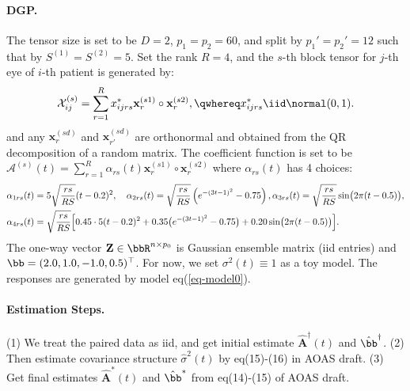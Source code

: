 \documentclass[10pt]{notes}
\begin{document}
\paragraph*{DGP.}
The tensor size is set to be $D=2$, $p_1=p_2=60$, and split by $p_1'=p_2'=12$ such that by $S^{(1)}=S^{(2)}=5$. Set the rank $R=4$, and the $s$-th block tensor for $j$-th eye of $i$-th patient is generated by:
\begin{align*}
    \mathcal{X}_{ij}^{(s)}=\sum_{r=1}^{R}x^*_{ijrs}\mathbf{x}_{r}^{(s1)}\circ\mathbf{x}_{r}^{(s2)},
    \qwhereq
    x_{ijrs}^*\iid \normal(0,1).
\end{align*}
and any $\mathbf{x}_{r}^{(sd)}$ and $\mathbf{x}_{r'}^{(sd)}$ are orthonormal and obtained from the QR decomposition of a random matrix. The coefficient function is set to be $\mathcal{A}^{(s)}(t)=\sum_{r=1}^{R} \alpha_{rs}(t)\mathbf{x}_r^{(s1)}\circ \mathbf{x}_r^{(s2)}$ where $\alpha_{rs}(t)$ has 4 choices:
\begin{align}
    \label{eq-sim-coef1}
    &\alpha_{1rs}(t)=
    5\sqrt{\frac{rs}{RS}}(t-0.2)^2,\quad
    \alpha_{2rs}(t)=
    \sqrt{\frac{rs}{RS}}
    \left(e^{-(3t-1)^2}-0.75\right), 
    \alpha_{3rs}(t)=
    \sqrt{\frac{rs}{RS}}\sin\bigl(2\pi(t-0.5)\bigr),\\
    &\alpha_{4rs}(t)=
    \sqrt{\frac{rs}{RS}}
    \Bigl[
    0.45\cdot 5(t-0.2)^2
    +0.35\bigl(e^{-(3t-1)^2}-0.75\bigr)
    +0.20\sin\bigl(2\pi(t-0.5)\bigr)
    \Bigr].
    \label{eq-sim-coef2}
\end{align}
The one-way vector $\mathbf{Z}\in\bbR^{n\times p_0}$ is Gaussian ensemble matrix (iid entries) and $\bb=(2.0,1.0,-1.0,0.5)^\top$. For now, we set $\sigma^2(t)\equiv 1$ as a toy model. The responses are generated by model eq(\ref{eq-model0}).

\paragraph{Estimation Steps.} (1) We treat the paired data as iid, and get initial estimate $\hat{\mathbf{A}}^\dagger(t)$ and $\hat{\bb}^\dagger$. (2) Then estimate covariance structure $\hat{\sigma}^2(t)$ by eq(15)-(16) in AOAS draft.
(3) Get final estimates $\hat{\mathbf{A}}^*(t)$ and $\hat{\bb}^*$ from eq(14)-(15) of AOAS draft.
\end{document}
